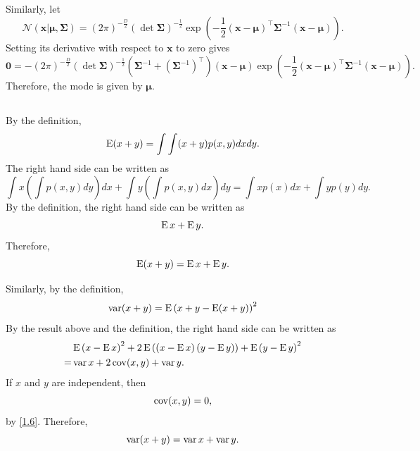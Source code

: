 Similarly, let
%
\begin{equation}
\mathcal{N} 
\left( 
	\mathbf{x} 
	| 
	\bm{\mu}, 
	\bm{\Sigma} 
\right) 
= 
\left( 
	2 \pi 
\right) ^ {- \frac{D}{2}} 
(\det \bm{\Sigma}) ^ {- \frac{1}{2}} 
\exp 
\left( 
	- 
	\frac{1}{2} 
	(\mathbf{x} - \bm{\mu}) ^ \intercal 
	\bm{\Sigma} ^ {- 1} 
	(\mathbf{x} - \bm{\mu}) 
\right).
\end{equation}
%
Setting its derivative with respect to $\mathbf{x}$ to zero gives
%
\begin{equation}
\mathbf{0} 
= 
- 
\left( 
	2 \pi 
\right) ^ {- \frac{D}{2}} 
(\det \bm{\Sigma}) ^ {- \frac{1}{2}} 
\left( 
	\bm{\Sigma} ^ {- 1} 
	+ 
	\left( 
		\bm{\Sigma} ^ {- 1}
	\right) ^ \intercal 
\right) 
(\mathbf{x} - \bm{\mu}) 
\exp 
\left( 
	- 
	\frac{1}{2} 
	(\mathbf{x} - \bm{\mu}) ^ \intercal 
	\bm{\Sigma} ^ {- 1} 
	(\mathbf{x} - \bm{\mu}) 
\right).
\end{equation}
%
Therefore, the mode is given by $\bm{\mu}$.


\subsection{}
\label{1.10}
By the definition,
%
\begin{equation}
\operatorname{E} (x + y) 
= 
\int 
\int 
(x + y) 
p(x, y) 
dx 
dy.
\end{equation}
%
The right hand side can be written as 
%
\begin{equation}
\int 
x 
\left( 
	\int 
	p(x, y) 
	dy 
\right) 
dx 
+ 
\int 
y 
\left( 
	\int 
	p(x, y) 
	dx 
\right) 
dy 
= 
\int 
x 
p(x) 
dx 
+ 
\int 
y 
p(y) 
dy.
\end{equation}
%
By the definition, the right hand side can be written as 
%
\begin{equation}
\operatorname{E} x 
+ 
\operatorname{E} y.
\end{equation}
%
Therefore, 
%
\begin{equation}
\operatorname{E} (x + y) 
= 
\operatorname{E} x 
+ 
\operatorname{E} y.
\end{equation}
%

Similarly, by the definition,
%
\begin{equation}
\operatorname{var} (x + y) 
= 
\operatorname{E} 
\left( 
	x 
	+ 
	y 
	- 
	\operatorname{E} (x + y) 
\right) ^ 2
\end{equation}
%
By the result above and the definition, the right hand side can be written as 
%
\begin{equation}
\begin{aligned}
&
\operatorname{E} 
\left( 
	x 
	- 
	\operatorname{E} x 
\right) ^ 2 
+ 
2 
\operatorname{E} 
\left( 
	\left( 
		x 
		- 
		\operatorname{E} x 
	\right) 
	\left( 
		y 
		- 
		\operatorname{E} y 
	\right) 
\right) 
+ 
\operatorname{E} 
\left( 
	y 
	- 
	\operatorname{E} y 
\right) ^ 2 
\\
=& 
\operatorname{var} x 
+ 
2 \operatorname{cov} (x, y) 
+ 
\operatorname{var} y.
\end{aligned}
\end{equation}
%
If $x$ and $y$ are independent, then 
%
\begin{equation}
\operatorname{cov} (x, y) 
= 
0,
\end{equation}
%
by \ref{1.6}. Therefore,
%
\begin{equation}
\operatorname{var} (x + y) 
= 
\operatorname{var} x 
+ 
\operatorname{var} y.
\end{equation}
%



